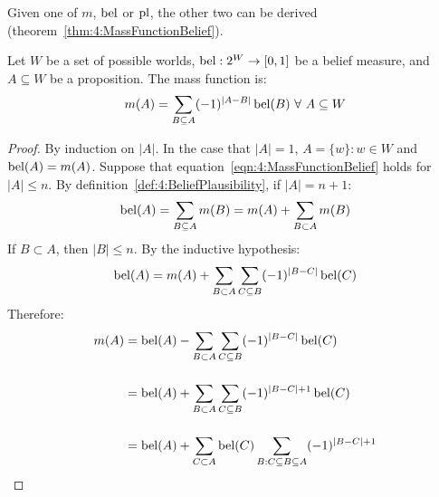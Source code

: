 Given one of $m$, $\operatorname*{bel}$ or $\operatorname*{pl}$, the other two can be derived
(theorem~\ref{thm:4:MassFunctionBelief}).

\begin{thm}
  \label{thm:4:MassFunctionBelief}
  Let $W$ be a set of possible worlds,
  $\operatorname*{bel} : 2^W \rightarrow [0, 1]$ be a belief measure, and
  $A \subseteq W$ be a proposition.
  The mass function is:
  \begin{equation}
    \label{eqn:4:MassFunctionBelief}
    m(A) = \sum_{B \subseteq A} (-1)^{|A - B|} \operatorname*{bel}(B)
    \ \forall\
    A \subseteq W
  \end{equation}

  \begin{proof}
    By induction on $|A|$.
    In the case that $|A| = 1$, $A = \{w\} : w \in W$ and $\operatorname*{bel}(A) = m(A)$.
    Suppose that equation~\ref{eqn:4:MassFunctionBelief} holds for $|A| \leq n$.
    By definition~\ref{def:4:BeliefPlausibility}, if $|A| = n + 1$:
    \begin{equation*}
      \operatorname*{bel}(A) = \sum_{B \subseteq A} m(B) = m(A) + \sum_{B \subset A} m(B)
    \end{equation*}
    If $B \subset A$, then $|B| \leq n$.
    By the inductive hypothesis:
    \begin{equation*}
      \operatorname*{bel}(A) = m(A) + \sum_{B \subset A} \sum_{C \subseteq B} (-1)^{|B - C|} \operatorname*{bel}(C)
    \end{equation*}
    Therefore:
    \begin{align}
      \label{eqn:4:MassFunctionBelief1}
      m(A)
       & =
      \operatorname*{bel}(A) -
      \sum_{B \subset A} \sum_{C \subseteq B} (-1)^{|B - C|} \operatorname*{bel}(C)
      \nonumber \\[3ex]
       & =
      \operatorname*{bel}(A) +
      \sum_{B \subset A} \sum_{C \subseteq B} (-1)^{|B - C| + 1} \operatorname*{bel}(C)
      \nonumber \\[3ex]
       & =
      \operatorname*{bel}(A) +
      \sum_{C \subset A} \operatorname*{bel}(C) \sum_{B : C \subseteq B \subseteq A} (-1)^{|B - C| + 1}
    \end{align}


\end{proof}
\end{thm}
